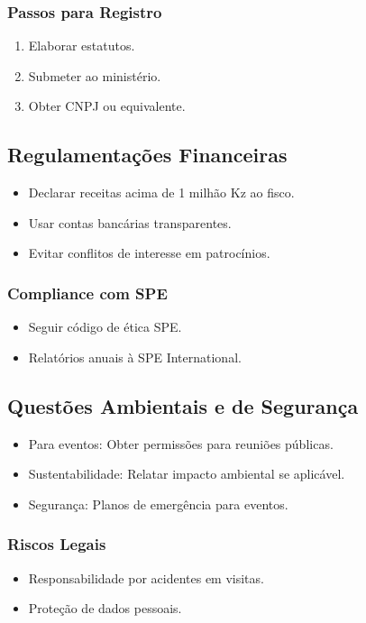\documentclass[12pt]{article}
\begin{document}
\subsubsection{Passos para Registro}
\begin{enumerate}
    \item Elaborar estatutos.
    \item Submeter ao ministério.
    \item Obter CNPJ ou equivalente.
\end{enumerate}

\subsection{Regulamentações Financeiras}
\begin{itemize}
    \item Declarar receitas acima de 1 milhão Kz ao fisco.
    \item Usar contas bancárias transparentes.
    \item Evitar conflitos de interesse em patrocínios.
\end{itemize}

\subsubsection{Compliance com SPE}
\begin{itemize}
    \item Seguir código de ética SPE.
    \item Relatórios anuais à SPE International.
\end{itemize}

\subsection{Questões Ambientais e de Segurança}
\begin{itemize}
    \item Para eventos: Obter permissões para reuniões públicas.
    \item Sustentabilidade: Relatar impacto ambiental se aplicável.
    \item Segurança: Planos de emergência para eventos.
\end{itemize}

\subsubsection{Riscos Legais}
\begin{itemize}
    \item Responsabilidade por acidentes em visitas.
    \item Proteção de dados pessoais.
\end{itemize}
\end{document}
